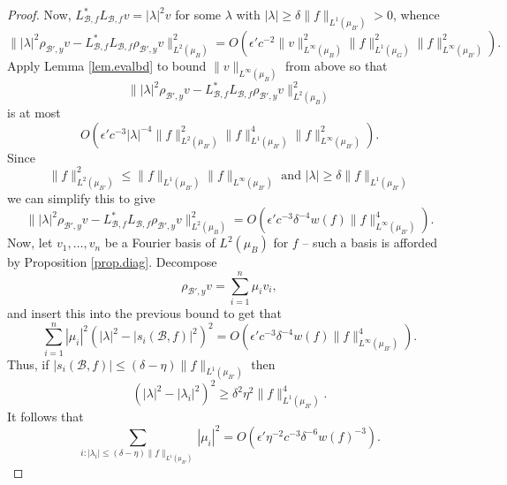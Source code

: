 \documentclass[12pt]{amsart}
\numberwithin{equation}{section}
\theoremstyle{plain}
\theoremstyle{definition}
\renewcommand{\leq}{\leqslant}
\renewcommand{\geq}{\geqslant}
\begin{document}
\begin{proof}
Now, $L_{\mathcal{B},f}^*L_{\mathcal{B},f}v=|\lambda|^2 v$ for some $\lambda$ with $|\lambda| \geq \delta \|f\|_{L^1(\mu_{B'})}>0$, whence
\begin{equation*}
\||\lambda|^2 \rho_{\mathcal{B}',y}v - L_{\mathcal{B},f}^*L_{\mathcal{B},f}\rho_{\mathcal{B}',y}v\|_{L^2(\mu_B)}^2  =O(\epsilon'c^{-2} \|v\|_{L^\infty(\mu_B)}^2\|f\|_{L^1(\mu_G)}^2\|f\|_{L^\infty(\mu_{B'})}^2).
\end{equation*}
Apply Lemma \ref{lem.evalbd} to bound $\|v\|_{L^\infty(\mu_{B})}$ from above so that
\begin{equation*}
\||\lambda|^2 \rho_{\mathcal{B}',y}v - L_{\mathcal{B},f}^*L_{\mathcal{B},f}\rho_{\mathcal{B}',y}v\|_{L^2(\mu_B)}^2
\end{equation*}
is at most
\begin{equation*}
O( \epsilon'c^{-3}|\lambda|^{-4}\|f\|_{L^2(\mu_{B'})}^{2}\|f\|_{L^1(\mu_{B'})}^{4}\|f\|_{L^\infty(\mu_{B'})}^{2}).
\end{equation*}
Since
\begin{equation*}
\|f\|_{L^2(\mu_{B'})}^2 \leq \|f\|_{L^1(\mu_{B'})}\|f\|_{L^\infty(\mu_{B'})} \textrm{ and } |\lambda| \geq \delta\|f\|_{L^1(\mu_{B'})}
\end{equation*}
we can simplify this to give
\begin{equation*}
\||\lambda|^2 \rho_{\mathcal{B}',y}v - L_{\mathcal{B},f}^*L_{\mathcal{B},f}\rho_{\mathcal{B}',y}v\|_{L^2(\mu_B)}^2  =O( \epsilon'c^{-3}\delta^{-4}w(f)\|f\|_{L^\infty(\mu_{B'})}^4).
\end{equation*}
Now, let $v_1,\dots,v_n$ be a Fourier basis of $L^2(\mu_B)$ for $f$  -- such a basis is afforded by Proposition \ref{prop.diag}. Decompose
\begin{equation*}
\rho_{\mathcal{B}',y}v=\sum_{i=1}^n{\mu_iv_i},
\end{equation*}
and insert this into the previous bound to get that
\begin{equation*}
\sum_{i=1}^n{|\mu_i|^2(|\lambda|^2-|s_i(\mathcal{B},f)|^2)^2} =O( \epsilon'c^{-3}\delta^{-4}w(f)\|f\|_{L^\infty(\mu_{B'})}^4).
\end{equation*}
Thus, if $|s_i(\mathcal{B},f)| \leq (\delta-\eta)\|f\|_{L^1(\mu_{B'})}$ then
\begin{equation*}
(|\lambda|^2 - |\lambda_i|^2)^2 \geq \delta^2\eta^2 \|f\|_{L^1(\mu_{B'})}^4.
\end{equation*}
It follows that
\begin{equation*}
\sum_{i: |\lambda_i| \leq (\delta-\eta)\|f\|_{L^1(\mu_{B'})}}{|\mu_i|^2} =O( \epsilon'\eta^{-2}c^{-3}\delta^{-6}w(f)^{-3}).

\end{equation*}
\end{proof}
\end{document}
